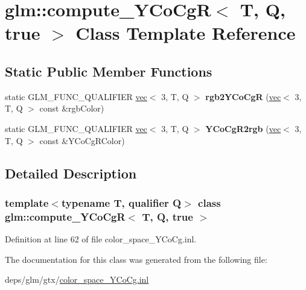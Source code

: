 \hypertarget{classglm_1_1compute__YCoCgR_3_01T_00_01Q_00_01true_01_4}{}\section{glm\+:\+:compute\+\_\+\+Y\+Co\+CgR$<$ T, Q, true $>$ Class Template Reference}
\label{classglm_1_1compute__YCoCgR_3_01T_00_01Q_00_01true_01_4}
\subsection*{Static Public Member Functions}
\begin{DoxyCompactItemize}
\item 
\mbox{\label{classglm_1_1compute__YCoCgR_3_01T_00_01Q_00_01true_01_4_a1cf1c142223066bbf63e906c7f426bc4}} 
static G\+L\+M\+\_\+\+F\+U\+N\+C\+\_\+\+Q\+U\+A\+L\+I\+F\+I\+ER \hyperlink{structglm_1_1vec}{vec}$<$ 3, T, Q $>$ {\bfseries rgb2\+Y\+Co\+CgR} (\hyperlink{structglm_1_1vec}{vec}$<$ 3, T, Q $>$ const \&rgb\+Color)
\item 
\mbox{\label{classglm_1_1compute__YCoCgR_3_01T_00_01Q_00_01true_01_4_aa5c06979ab1f4762a3d4528d55e9655d}} 
static G\+L\+M\+\_\+\+F\+U\+N\+C\+\_\+\+Q\+U\+A\+L\+I\+F\+I\+ER \hyperlink{structglm_1_1vec}{vec}$<$ 3, T, Q $>$ {\bfseries Y\+Co\+Cg\+R2rgb} (\hyperlink{structglm_1_1vec}{vec}$<$ 3, T, Q $>$ const \&Y\+Co\+Cg\+R\+Color)
\end{DoxyCompactItemize}


\subsection{Detailed Description}
\subsubsection*{template$<$typename T, qualifier Q$>$\newline
class glm\+::compute\+\_\+\+Y\+Co\+Cg\+R$<$ T, Q, true $>$}



Definition at line 62 of file color\+\_\+space\+\_\+\+Y\+Co\+Cg.\+inl.



The documentation for this class was generated from the following file\+:\begin{DoxyCompactItemize}
\item 
deps/glm/gtx/\hyperlink{color__space__YCoCg_8inl}{color\+\_\+space\+\_\+\+Y\+Co\+Cg.\+inl}\end{DoxyCompactItemize}
